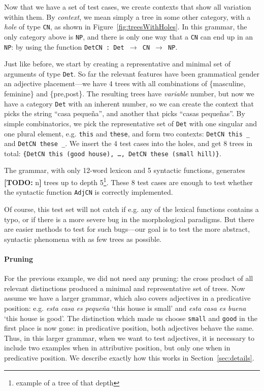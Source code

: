 \documentclass[11pt]{article}
\def\t#1{\texttt{#1}}
\newcommand{\todo}[1]{{\color{cyan}\textbf{[TODO: }#1\textbf{]}}}
\begin{document}
Now that we have a set of test cases, we create contexts that show all variation within them.
By \emph{context}, we mean simply a tree in some other category, with a \emph{hole} of type \t{CN}, as shown in Figure~\ref{fig:treesWithHoles}.
In this grammar, the only category above is \t{NP}, and there is only one way that a \t{CN} can end up in an \t{NP}: by using the function \t{DetCN : Det $\rightarrow$ CN $\rightarrow$ NP}.

Just like before, we start by creating a representative and minimal set of arguments of type \t{Det}. So far the relevant features have been grammatical gender an adjective placement---we have 4 trees with all combinations of \{masculine, feminine\} and \{pre,post\}. The resulting trees have \emph{variable} number, but now we have a category \t{Det} with an inherent number, so we can create the context that picks the string ``casa  peque\~{n}a'', and another that picks ``casas  peque\~{n}as''. By simple combinatorics, we pick the representative set of \t{Det} with one singular and one plural element, e.g. \t{this} and \t{these}, and form two contexts: \verb|DetCN this _| and  \verb|DetCN these _|. We insert the 4 test cases into the holes, and get 8 trees in total: \t{\{DetCN this (good house), \dots, DetCN these (small hill)\}}.


The grammar, with only 12-word lexicon and 5 syntactic functions, generates \todo{n} trees up to depth 5\footnote{example of a tree of that depth}. These 8 test cases are enough to test whether the syntactic function \t{AdjCN} is correctly implemented.  

Of course, this test set will not catch if e.g. any of the lexical functions contains a typo, or if there is a more severe bug in the morphological paradigms. But there are easier methods to test for such bugs---our goal is to test the more abstract, syntactic phenomena with as few trees as possible.


\paragraph{Pruning}

For the previous example, we did not need any pruning: the cross product of all relevant distinctions produced a minimal and representative set of trees. Now assume we have a larger grammar, which also covers adjectives in a predicative position: e.g. \emph{esta casa es peque\~{n}a} `this house is small' and \emph{esta casa es buena} `this house is good'. The distinction which made us choose \t{small} and \t{good} in the first place is now gone: in predicative position, both adjectives behave the same. Thus, in this larger grammar, when we want to test adjectives, it is necessary to include two examples when in attributive position, but only one when in predicative position. We describe exactly how this works in Section~\ref{sec:details}.
\end{document}
